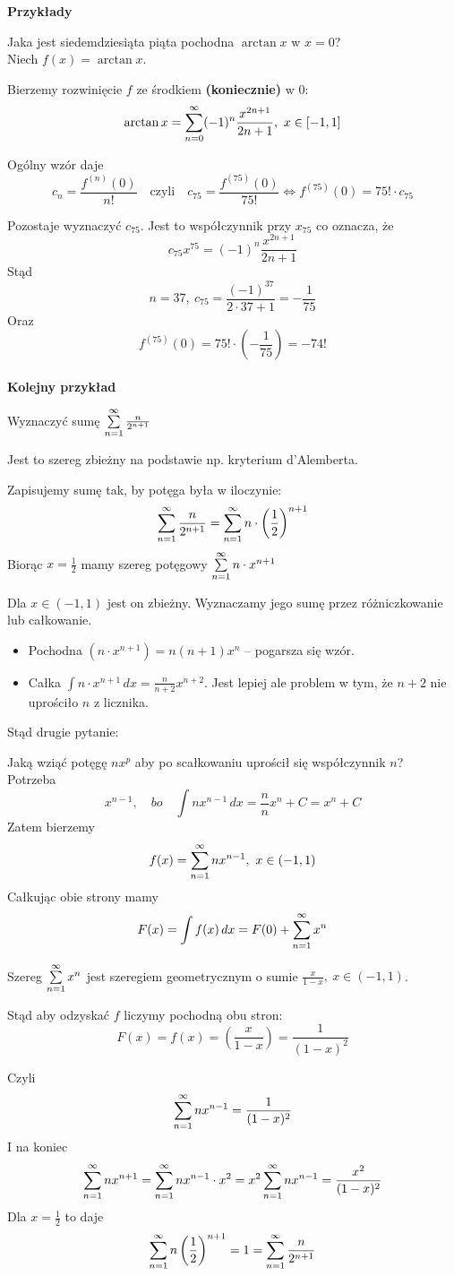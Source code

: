\textbf{Przykłady}

Jaka jest siedemdziesiąta piąta pochodna $\arctan x$ w $x = 0$? \\

Niech $f(x) = \arctan x $. 

Bierzemy rozwinięcie $f$ ze środkiem \textbf{(koniecznie)} w $0$:
$$ \arctan x = \sum\limits_{n = 0}^{\infty} (-1)^n \frac{x^{2n+1}}{2n+1}, \ x\in [-1, 1] $$

Ogólny wzór daje
$$ c_n = \frac{f^{(n)}(0)}{n!} \quad \textrm{czyli} \quad c_{75} = \frac{f^{(75)}(0)}{75!} \Leftrightarrow f^{(75)}(0) = 75! \cdot c_{75} $$

Pozostaje wyznaczyć $c_{75}$. Jest to współczynnik przy $ x_{75} $ co oznacza, że
$$ c_{75} x^{75} = (-1)^n \frac{x^{2n+1}}{2n+1} $$
Stąd
$$ n = 37, \ c_{75} = \frac{(-1)^{37}}{2 \cdot 37 + 1} = - \frac{1}{75} $$
Oraz
$$ f^{(75)}(0) = 75! \cdot \left( - \frac{1}{75} \right) = -74! $$ \\

\textbf{Kolejny przykład}

Wyznaczyć sumę $ \sum\limits_{n = 1}^{\infty} \frac{n}{2^{n + 1}} $

Jest to szereg zbieżny na podstawie np. kryterium d'Alemberta.

Zapisujemy sumę tak, by potęga była w iloczynie:
$$ \sum\limits_{n = 1}^{\infty} \frac{n}{2^{n+1}} = \sum\limits_{n = 1}^{\infty} n \cdot \left( \frac{1}{2} \right)^{n+1} $$
Biorąc $ x = \frac{1}{2} $ mamy szereg potęgowy $ \sum\limits_{n = 1}^{\infty} n \cdot x^{n+1} $

Dla $ x\in (-1, 1) $ jest on zbieżny. Wyznaczamy jego sumę przez różniczkowanie lub całkowanie.

\begin{itemize}
    \item Pochodna $ (n \cdot x^{n+1}) = n(n+1)x^n $ -- pogarsza się wzór.
    \item Całka $ \int n \cdot x^{n+1} \,dx = \frac{n}{n+2}x^{n+2} $. Jest lepiej ale problem w tym, że $n+2$ nie uprościło $n$ z licznika.
\end{itemize}

Stąd drugie pytanie:

Jaką wziąć potęgę $nx^p$ aby po scałkowaniu uprościł się współczynnik $n$? \\

Potrzeba
$$ x^{n-1}, \quad bo \quad \int nx^{n-1} \,dx = \frac{n}{n} x^n + C = x^n + C $$
Zatem bierzemy
$$ f(x) = \sum\limits_{n = 1}^{\infty} nx^{n-1}, \ x\in (-1, 1) $$
Całkując obie strony mamy
$$ F(x) = \int f(x) \,dx = F(0) + \sum\limits_{n = 1}^{\infty} x^n $$

Szereg $ \sum\limits_{n = 1}^{\infty} x^n $ jest szeregiem geometrycznym o sumie $ \frac{x}{1-x}, \ x\in (-1, 1) $.

Stąd aby odzyskać $f$ liczymy pochodną obu stron:
$$ F(x) = f(x) = \left( \frac{x}{1-x} \right) = \frac{1}{(1-x)^2} $$

Czyli
$$ \sum\limits_{n = 1}^{\infty} nx^{n-1} = \frac{1}{(1-x)^2} $$
I na koniec
$$ \sum\limits_{n = 1}^{\infty} nx^{n+1} = \sum\limits_{n = 1}^{\infty} nx^{n-1} \cdot x^2 = x^2 \sum\limits_{n = 1}^{\infty} nx^{n-1} = \frac{x^2}{(1-x)^2} $$
Dla $ x = \frac{1}{2} $ to daje
$$ \sum\limits_{n = 1}^{\infty} n \left( \frac{1}{2} \right)^{n+1} = 1 = \sum\limits_{n = 1}^{\infty} \frac{n}{2^{n+1}} $$